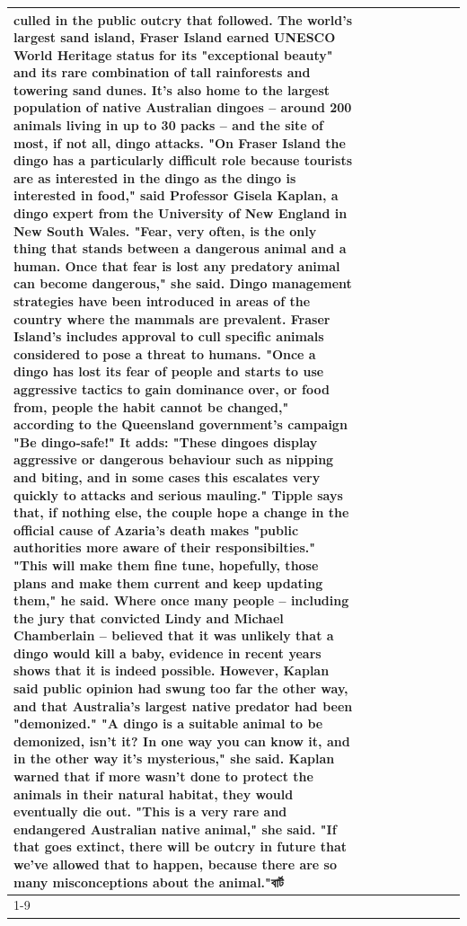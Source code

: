 \begin{table}[H]
\begin{tabular}{lllrlllll}
culled in the public outcry that followed. The world's largest sand island, Fraser Island earned UNESCO World Heritage status for its "exceptional beauty" and its rare combination of tall rainforests and towering sand dunes. It's also home to the largest population of native Australian dingoes -- around 200 animals living in up to 30 packs -- and the site of most, if not all, dingo attacks. "On Fraser Island the dingo has a particularly difficult role because tourists are as interested in the dingo as the dingo is interested in food," said Professor Gisela Kaplan, a dingo expert from the University of New England in New South Wales. "Fear, very often, is the only thing that stands between a dangerous animal and a human. Once that fear is lost any predatory animal can become dangerous," she said. Dingo management strategies have been introduced in areas of the country where the mammals are prevalent. Fraser Island's includes approval to cull specific animals considered to pose a threat to humans. "Once a dingo has lost its fear of people and starts to use aggressive tactics to gain dominance over, or food from, people the habit cannot be changed," according to the Queensland government's campaign "Be dingo-safe!" It adds: "These dingoes display aggressive or dangerous behaviour such as nipping and biting, and in some cases this escalates very quickly to attacks and serious mauling." Tipple says that, if nothing else, the couple hope a change in the official cause of Azaria's death makes "public authorities more aware of their responsibilties." "This will make them fine tune, hopefully, those plans and make them current and keep updating them," he said. Where once many people -- including the jury that convicted Lindy and Michael Chamberlain -- believed that it was unlikely that a dingo would kill a baby, evidence in recent years shows that it is indeed possible. However, Kaplan said public opinion had swung too far the other way, and that Australia's largest native predator had been "demonized." "A dingo is a suitable animal to be demonized, isn't it? In one way you can know it, and in the other way it's mysterious," she said. Kaplan warned that if more wasn't done to protect the animals in their natural habitat, they would eventually die out. "This is a very rare and endangered Australian native animal," she said. "If that goes extinct, there will be outcry in future that we've allowed that to happen, because there are so many misconceptions about the animal."বার্ট \\
\cline{1-9}

\end{tabular}
\end{table}
